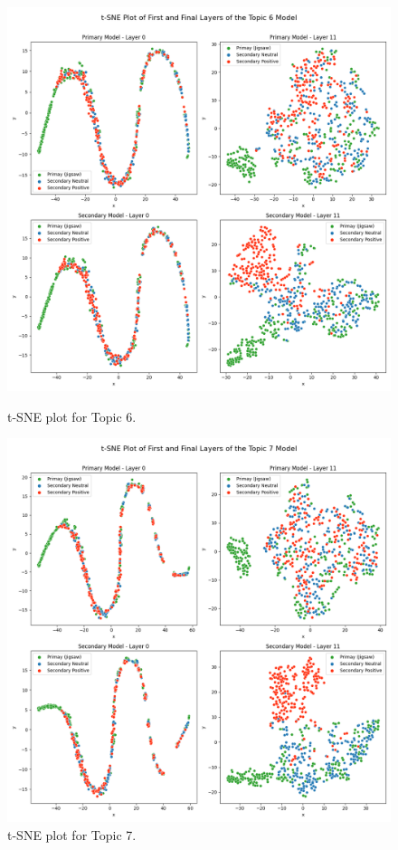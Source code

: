 \begin{figure}[ht]
    \centering

    \begin{minipage}{0.49\textwidth}
        \centering
        \includegraphics[width=\linewidth]{graphs/tsne/topic_6.png}
        \caption{t-SNE plot for Topic 6.}
        \label{sub:topic6}
    \end{minipage}
    \hfill
    \begin{minipage}{0.49\textwidth}
        \centering
        \includegraphics[width=\linewidth]{graphs/tsne/topic_7.png}
        \caption{t-SNE plot for Topic 7.}
        \label{sub:topic7}
    \end{minipage}


\end{figure}
